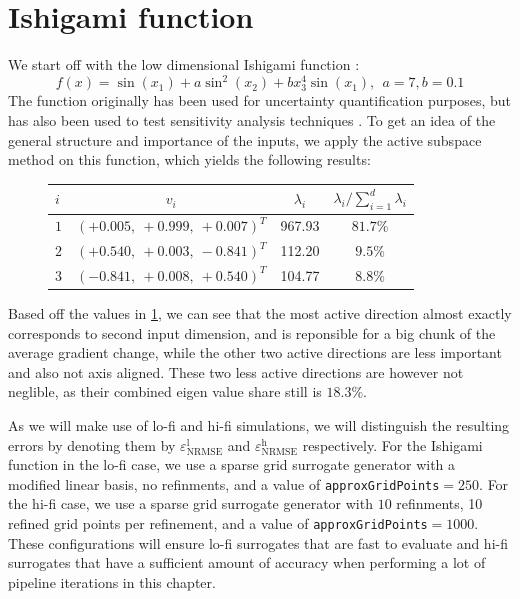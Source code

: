 \documentclass[
  a4paper,  %
  twoside,  %
  bibliography=totoc,
  headsepline,
  cleardoublepage=empty,
  parskip=half,
  draft=false
]{scrbook}
\begin{document}
\section{Ishigami function}

We start off with the low dimensional Ishigami function \cite{Ishigami1990AnIQ}:
\begin{equation}
f(x)=\sin(x_1) + a \sin^2(x_2) + b x_3^4 \sin(x_1), ~~ a = 7, b=0.1
\end{equation}
%
The function originally has been used for uncertainty quantification purposes, but has also been used to test sensitivity analysis techniques \cite{Sobol1999}.
To get an idea of the general structure and importance of the inputs, we apply the active subspace method on this function, which yields the following results:

\begin{mdframed}[style=style]
\begin{figure}[H]
\centering

\bgroup
\def\arraystretch{1.2}%
  \begin{tabular}{ l | c c c}
$i$ & $v_i$ & $\lambda_i$ & $\lambda_i / \sum_{i=1}^d \lambda_i$\\
\hline
$1$ & $(+0.005, ~+0.999, ~+0.007)^T$ & 967.93 & $81.7\%$\\
$2$  & $(+0.540, ~+0.003, ~-0.841)^T$ & 112.20 & $9.5\%$\\
$3$ & $(-0.841, ~+0.008, ~+0.540)^T$ & 104.77 & $8.8\%$\\
\end{tabular}
\egroup
\vspace{0.5em}

\delimit

\label{tab:ishigami_as}
\end{figure}
\end{mdframed}
%
Based off the values in \cref{tab:ishigami_as}, we can see that the most active direction almost exactly corresponds to second input dimension, and is reponsible for a big chunk of the average gradient change, while the other two active directions are less important and also not axis aligned.
These two less active directions are however not neglible, as their combined eigen value share still is $18.3\%$.

As we will make use of lo-fi and hi-fi simulations, we will distinguish the resulting errors by denoting them by $\varepsilon^\mathrm{l}_{\mathrm{NRMSE}}$ and $\varepsilon^\mathrm{h}_{\mathrm{NRMSE}}$ respectively.
For the Ishigami function in the lo-fi case, we use a sparse grid surrogate generator with a modified linear basis, no refinments, and a value of \texttt{approxGridPoints}$=250$.
For the hi-fi case, we use a sparse grid surrogate generator with $10$ refinments, 10 refined grid points per refinement, and a value of \texttt{approxGridPoints}$=1000$.
These configurations will ensure lo-fi surrogates that are fast to evaluate and hi-fi surrogates that have a sufficient amount of accuracy when performing a lot of pipeline iterations in this chapter.
\end{document}
